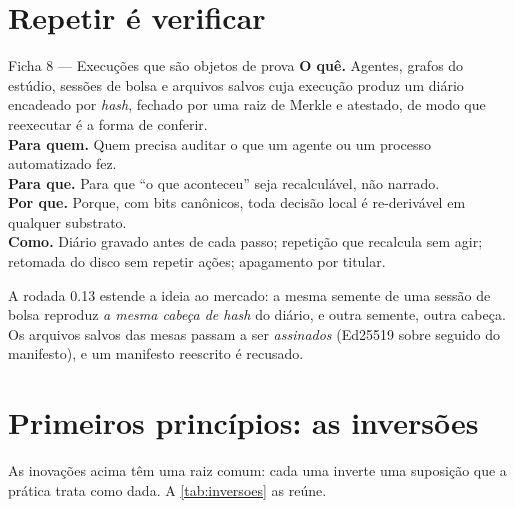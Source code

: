 \section{Repetir é verificar}\label{sec:inov-repetir}

\begin{ficha}{Ficha 8 --- Execuções que são objetos de prova}
\textbf{O quê.} Agentes, grafos do estúdio, sessões de bolsa e arquivos salvos cuja execução produz um diário encadeado por \textit{hash}, fechado por uma raiz de Merkle e atestado, de modo que reexecutar é a forma de conferir.\\
\textbf{Para quem.} Quem precisa auditar o que um agente ou um processo automatizado fez.\\
\textbf{Para que.} Para que ``o que aconteceu'' seja recalculável, não narrado.\\
\textbf{Por que.} Porque, com bits canônicos, toda decisão local é re-derivável em qualquer substrato.\\
\textbf{Como.} Diário gravado antes de cada passo; repetição que recalcula sem agir; retomada do disco sem repetir ações; apagamento por titular.
\end{ficha}

A rodada 0.13 estende a ideia ao mercado: a mesma semente de uma sessão de bolsa reproduz \emph{a mesma cabeça de hash} do diário, e outra semente, outra cabeça. Os arquivos salvos das mesas passam a ser \emph{assinados} (Ed25519 sobre  seguido do manifesto), e um manifesto reescrito é recusado.

\section{Primeiros princípios: as inversões}\label{sec:inov-inversoes}

As inovações acima têm uma raiz comum: cada uma inverte uma suposição que a prática trata como dada. A \autoref{tab:inversoes} as reúne.

